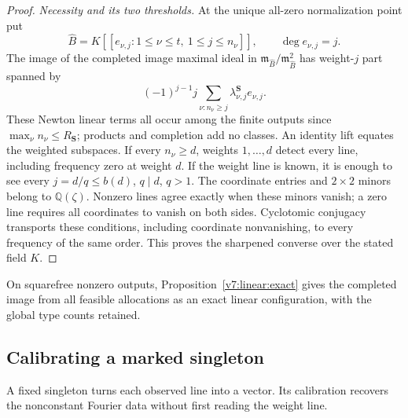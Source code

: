 \documentclass[10pt,fleqn]{article}
\numberwithin{equation}{section}
\begin{document}
\begin{proof}
\emph{Necessity and its two thresholds.}
At the unique all-zero normalization point put
\[
 \widehat B=K[[e_{\nu,j}:1\le\nu\le t,\ 1\le j\le n_\nu]],
 \qquad \deg e_{\nu,j}=j.
\]
The image of the completed image maximal ideal in
$\mathfrak m_{\widehat B}/\mathfrak m_{\widehat B}^2$ has weight-$j$
part spanned by
\begin{equation}\label{v6:spec:mixed-cotangent}
 (-1)^{j-1}j\sum_{\nu:n_\nu\ge j}
       \lambda^{\boldsymbol S}_{\nu,j}e_{\nu,j}.
\end{equation}
These Newton linear terms all occur among the finite outputs since
$\max_\nu n_\nu\le R_{\boldsymbol S}$; products and completion
add no classes.  An identity lift equates the weighted subspaces.  If every $n_\nu\ge d$, weights
$1,\ldots,d$ detect every line, including frequency zero at weight $d$.
If the weight line is known, it is enough to see every
$j=d/q\le b(d)$, $q\mid d$, $q>1$.
The coordinate entries and $2\times2$ minors belong to
$\mathbb Q(\zeta)$.  Nonzero lines agree exactly when these minors
vanish; a zero line requires all coordinates to vanish on both sides.
Cyclotomic conjugacy transports these conditions, including coordinate
nonvanishing, to every frequency of the same order.  This proves the
sharpened converse over the stated field $K$.
\end{proof}

On squarefree nonzero outputs, Proposition~\ref{v7:linear:exact}
gives the completed image from all feasible allocations as an exact
linear configuration, with the global type counts retained.

\subsection{Calibrating a marked singleton}
\label{r20:spec:calibration}
A fixed singleton turns each observed line into a vector.  Its calibration
recovers the nonconstant Fourier data without first reading the weight line.
\end{document}
